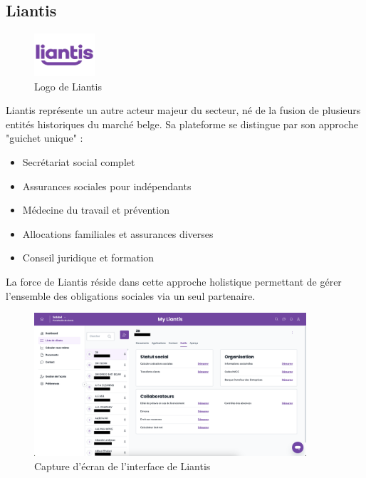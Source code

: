 \newpage
\subsection{Liantis}

\begin{figure}[H]
    \centering
    \includegraphics[width=0.2\textwidth]{liantisLogo.png}
    \caption{Logo de Liantis \cite{liantis}}
    \label{fig:liantisLogo}
\end{figure}

\noindent Liantis représente un autre acteur majeur du secteur, né de la fusion de plusieurs entités historiques du marché belge. Sa plateforme se distingue par son approche "guichet unique" :

\begin{itemize}[leftmargin=*,label=\textcolor{darkgray}{$\bullet$},itemsep=0.3em]
  \item Secrétariat social complet
  \item Assurances sociales pour indépendants
  \item Médecine du travail et prévention
  \item Allocations familiales et assurances diverses
  \item Conseil juridique et formation
\end{itemize}

\noindent La force de Liantis réside dans cette approche holistique permettant de gérer l'ensemble des obligations sociales via un seul partenaire.

\begin{figure}[H]
    \centering
    \includegraphics[width=0.9\textwidth]{liantisScreenshot.png}
    \caption{Capture d'écran de l'interface de Liantis \cite{liantis}}
    \label{fig:liantisScreenshot}
\end{figure}

